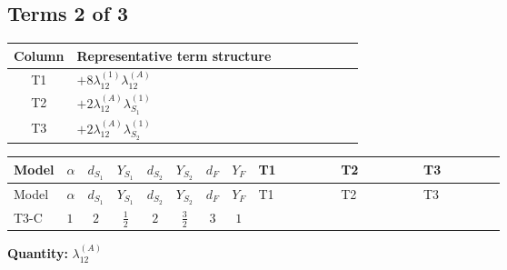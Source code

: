 \documentclass[8pt]{article}
\begin{document}
\begin{landscape}
\subsection*{Terms 2 of 3}
\begin{center}
\begin{tabular}{@{}c >{\raggedright\arraybackslash}p{0.82\linewidth}@{}}
\toprule
Column & Representative term structure \\
\midrule
T1 & \(\displaystyle +8 {\lambda_{12}^{(1)}} {\lambda_{12}^{(A)}}\) \\
\midrule
T2 & \(\displaystyle +2 {\lambda_{12}^{(A)}} {\lambda_{S_1}^{(1)}}\) \\
\midrule
T3 & \(\displaystyle +2 {\lambda_{12}^{(A)}} {\lambda_{S_2}^{(1)}}\) \\
\midrule
\bottomrule
\end{tabular}
\end{center}
\smallskip
\tiny
\begin{longtable}{@{}llcccccc >{\raggedright\arraybackslash}p{0.21\linewidth} >{\raggedright\arraybackslash}p{0.21\linewidth} >{\raggedright\arraybackslash}p{0.21\linewidth}@{}}
\toprule
Model & $\alpha$ & $d_{S_1}$ & $Y_{S_1}$ & $d_{S_2}$ & $Y_{S_2}$ & $d_F$ & $Y_F$ & T1 & T2 & T3 \\
\midrule
\endfirsthead
\toprule
Model & $\alpha$ & $d_{S_1}$ & $Y_{S_1}$ & $d_{S_2}$ & $Y_{S_2}$ & $d_F$ & $Y_F$ & T1 & T2 & T3 \\
\midrule
\endhead
T3-C & $1$ & $2$ & $\frac{1}{2}$ & $2$ & $\frac{3}{2}$ & $3$ & $1$ & \scriptsize\adjustbox{max width=\linewidth}{$\begin{gathered} +8 {\lambda_{12}^{(1)}} {\lambda_{12}^{(A)}}\end{gathered}$} & \scriptsize\adjustbox{max width=\linewidth}{$\begin{gathered} +2 {\lambda_{12}^{(A)}} {\lambda_{S_1}^{(1)}}\end{gathered}$} & \scriptsize\adjustbox{max width=\linewidth}{$\begin{gathered} +2 {\lambda_{12}^{(A)}} {\lambda_{S_2}^{(1)}}\end{gathered}$} \\
\midrule
\bottomrule
\end{longtable}
\clearpage
\noindent\textbf{Quantity: }$\lambda_{12}^{(A)}$\par\smallskip

\end{landscape}
\end{document}
